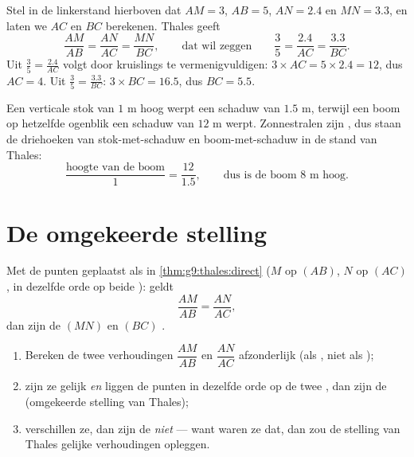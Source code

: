\begin{example}\label{ex:g9:thales:compute}
Stel in de linkerstand hierboven dat $AM = 3$, $AB = 5$, $AN = 2.4$ en
$MN = 3.3$, en laten we $AC$ en $BC$ berekenen. Thales geeft
\[
\frac{AM}{AB} = \frac{AN}{AC} = \frac{MN}{BC},
\qquad\text{dat wil zeggen}\qquad
\frac35 = \frac{2.4}{AC} = \frac{3.3}{BC}.
\]
Uit $\frac35 = \frac{2.4}{AC}$ volgt door kruislings te vermenigvuldigen:
$3 \times AC = 5 \times 2.4 = 12$, dus $AC = 4$. Uit $\frac35 = \frac{3.3}{BC}$:
$3 \times BC = 16.5$, dus $BC = 5.5$.
\end{example}

\begin{example}\label{ex:g9:thales:stick}
Een verticale stok van $1$ m hoog werpt een schaduw van $1.5$ m, terwijl een boom
op hetzelfde ogenblik een schaduw van $12$ m werpt. Zonnestralen zijn ,
dus staan de driehoeken van stok-met-schaduw en boom-met-schaduw in de stand van
Thales:
\[
\frac{\text{hoogte van de boom}}{1} = \frac{12}{1.5},
\qquad\text{dus is de boom } 8 \text{ m hoog.}
\]
\end{example}

\section{De omgekeerde stelling}

\begin{theorem}\label{thm:g9:thales:converse}
Met de punten geplaatst als in \cref{thm:g9:thales:direct} ($M$ op $(AB)$, $N$ op
$(AC)$, in dezelfde orde op beide ): geldt
\[
\frac{AM}{AB} = \frac{AN}{AC},
\]
dan zijn de  $(MN)$ en $(BC)$ .
\end{theorem}
\admitted

\begin{method}\label{met:g9:thales:converse}
\begin{enumerate}
  \item Bereken de twee verhoudingen $\dfrac{AM}{AB}$ en $\dfrac{AN}{AC}$
        afzonderlijk (als , niet als );
  \item zijn ze gelijk \emph{en} liggen de punten in dezelfde orde op de twee
        , dan zijn de   (omgekeerde stelling van Thales);
  \item verschillen ze, dan zijn de  \emph{niet}  --- want waren ze
        dat, dan zou de stelling van Thales gelijke verhoudingen opleggen.
\end{enumerate}
\end{method}

